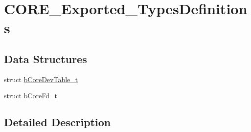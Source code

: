 \hypertarget{group___c_o_r_e___exported___types_definitions}{}\section{C\+O\+R\+E\+\_\+\+Exported\+\_\+\+Types\+Definitions}
\label{group___c_o_r_e___exported___types_definitions}
\subsection*{Data Structures}
\begin{DoxyCompactItemize}
\item 
struct \mbox{\hyperlink{structb_core_dev_table__t}{b\+Core\+Dev\+Table\+\_\+t}}
\item 
struct \mbox{\hyperlink{structb_core_fd__t}{b\+Core\+Fd\+\_\+t}}
\end{DoxyCompactItemize}


\subsection{Detailed Description}
